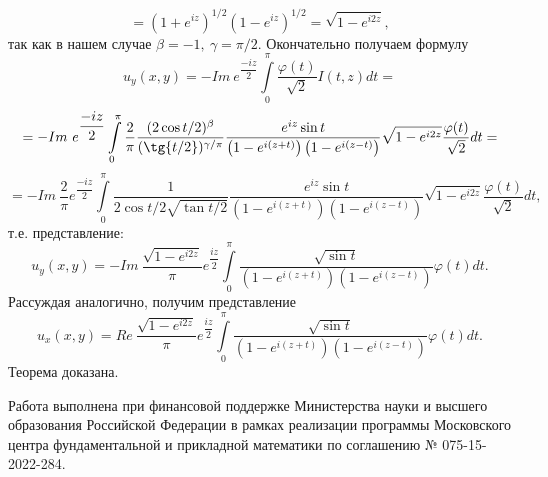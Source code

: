 \documentclass[a4paper, 9pt]{article}
\begin{document}
		\begin{equation*}
			= (1 + e^{iz})^{1/2} (1- e^{iz})^{1/2} =\sqrt{1 - e^{i2z}},
		\end{equation*}
		так как в нашем случае $\beta = -1, \ \gamma = \pi/2$.
		Окончательно получаем формулу
		\begin{equation*}
			u_y(x,y) = - Im\ e^{\dfrac{-iz}{2}} \int\limits_0^\pi \dfrac{\varphi(t)}{\sqrt2} I(t,z) dt =
		\end{equation*}
		\begin{equation*}
			 = - Im\ e^{\dfrac{-iz}{2}} \int\limits_0^\pi \dfrac{2}{\pi}\dfrac{(2\cos{t/2})^\beta}{(\tg{t/2})^{\gamma/\pi}}  \dfrac{e^{iz} \sin{t}}{\left(1 - e^{i(z+t)} \right) \left(1 - e^{i(z-t)}\right)} \sqrt{1 - e^{i2z}} \dfrac{\varphi(t)}{\sqrt2} dt =
		\end{equation*}
		\begin{equation*}
			 = - Im\  \dfrac{2}{\pi} e^{\dfrac{-iz}{2}} \int\limits_0^\pi \dfrac{1}{2\cos{t/2} \sqrt{\tan{t/2}}}  \dfrac{e^{iz} \sin{t}}{\left(1 - e^{i(z+t)} \right) \left(1 - e^{i(z-t)}\right)} \sqrt{1 - e^{i2z}} \dfrac{\varphi(t)}{\sqrt2} dt, 
		\end{equation*}
		т.е. представление:
		\begin{equation*}
			u_y(x,y) = - Im\  \dfrac{ \sqrt{1 - e^{i2z}} }{\pi} e^{\dfrac{iz}{2}}  \int\limits_0^\pi  \dfrac{\sqrt{\sin{t}} }{\left(1 - e^{i(z+t)} \right) \left(1 - e^{i(z-t)}\right)}  \varphi(t) dt.
		\end{equation*}
	 	Рассуждая аналогично, получим представление
	 		\begin{equation*}
	 			u_x(x,y) = Re\   \dfrac{ \sqrt{1 - e^{i2z}} }{\pi} e^{\dfrac{iz}{2}} \int\limits_0^\pi  \dfrac{\sqrt{\sin{t}}}{\left(1 - e^{i(z+t)} \right) \left(1 - e^{i(z-t)}\right)}  \varphi(t) dt.
	 		\end{equation*}
		Теорема доказана.
	\par
	Работа выполнена при финансовой поддержке Министерства науки и высшего образования Российской Федерации в рамках реализации программы Московского центра фундаментальной и прикладной математики по соглашению № 075-15-2022-284.
	\newline
	\newline
	\vspace{-2.3cm}
	\renewcommand{\refname}{\begin{center}
			{\normalsize \rm СПИСОК ЛИТЕРАТУРЫ} \end{center}}
	
\end{document}
